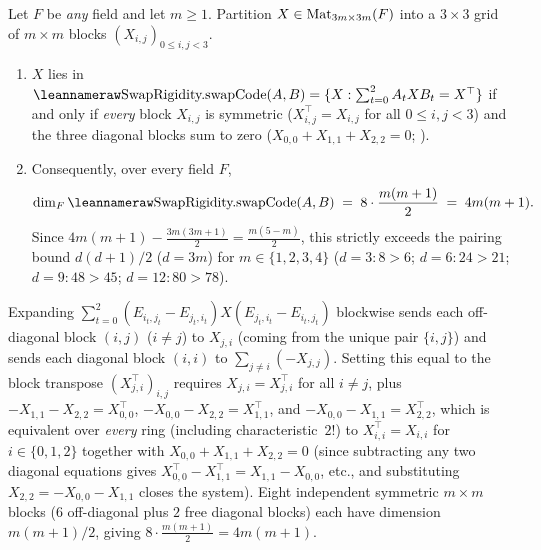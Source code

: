 \begin{theorem}\label{thm:three-term-kronecker}
Let $F$ be \emph{any} field and let $m \ge 1$. Partition $X \in \operatorname{Mat}_{3m\times 3m}(F)$ into a
$3 \times 3$ grid of $m \times m$ blocks $(X_{i,j})_{0 \le i,j < 3}$.
\begin{enumerate}[label=(\alph*)]
\item $X$ lies in $\leanname{SwapRigidity.swapCode}(A, B) = \{X : \sum_{t=0}^2 A_t X B_t = X^\top\}$
  if and only if \emph{every} block $X_{i,j}$ is symmetric ($X_{i,j}^\top = X_{i,j}$ for all
  $0 \le i, j < 3$) and the three diagonal blocks sum to zero ($X_{0,0} + X_{1,1} + X_{2,2} = 0$;
  ).
\item Consequently, over every field $F$,
  \[
    \dim_F \leanname{SwapRigidity.swapCode}(A, B) \;=\; 8 \cdot \frac{m(m+1)}{2} \;=\; 4m(m+1).
  \]
  Since $4m(m+1) - \frac{3m(3m+1)}{2} = \frac{m(5 - m)}{2}$, this strictly exceeds the pairing bound
  $d(d+1)/2$ ($d = 3m$) for $m \in \{1, 2, 3, 4\}$ ($d = 3: 8 > 6$; $d = 6: 24 > 21$;
  $d = 9: 48 > 45$; $d = 12: 80 > 78$).
\end{enumerate}
\end{theorem}
\begin{outline}
Expanding $\sum_{t=0}^2 (E_{i_t,j_t} - E_{j_t,i_t}) X (E_{j_t,i_t} - E_{i_t,j_t})$ blockwise sends
each off-diagonal block $(i, j)$ ($i \ne j$) to $X_{j,i}$ (coming from the unique pair $\{i,j\}$)
and sends each diagonal block $(i, i)$ to $\sum_{j \ne i} (-X_{j,j})$. Setting this equal to the
block transpose $(X_{j,i}^\top)_{i,j}$ requires $X_{j,i} = X_{j,i}^\top$ for all $i \ne j$, plus
$-X_{1,1} - X_{2,2} = X_{0,0}^\top$, $-X_{0,0} - X_{2,2} = X_{1,1}^\top$, and
$-X_{0,0} - X_{1,1} = X_{2,2}^\top$, which is equivalent over \emph{every} ring (including
characteristic~$2$!) to $X_{i,i}^\top = X_{i,i}$ for $i \in \{0,1,2\}$ together with
$X_{0,0} + X_{1,1} + X_{2,2} = 0$ (since subtracting any two diagonal equations gives
$X_{0,0}^\top - X_{1,1}^\top = X_{1,1} - X_{0,0}$, etc., and substituting $X_{2,2} = -X_{0,0} - X_{1,1}$
closes the system). Eight independent symmetric $m\times m$ blocks ($6$ off-diagonal plus $2$ free
diagonal blocks) each have dimension $m(m+1)/2$, giving $8 \cdot \frac{m(m+1)}{2} = 4m(m+1)$.
\end{outline}

